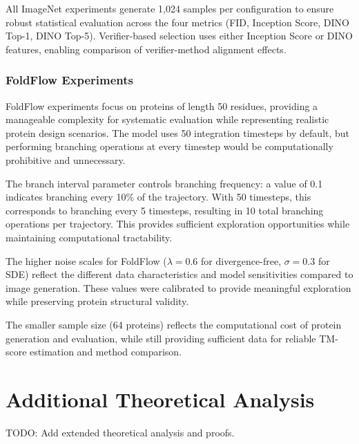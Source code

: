 \documentclass{article}
\begin{document}
All ImageNet experiments generate 1,024 samples per configuration to ensure robust statistical evaluation across the four metrics (FID, Inception Score, DINO Top-1, DINO Top-5). Verifier-based selection uses either Inception Score or DINO features, enabling comparison of verifier-method alignment effects.

\subsubsection{FoldFlow Experiments}

FoldFlow experiments focus on proteins of length 50 residues, providing a manageable complexity for systematic evaluation while representing realistic protein design scenarios. The model uses 50 integration timesteps by default, but performing branching operations at every timestep would be computationally prohibitive and unnecessary.

The branch interval parameter controls branching frequency: a value of 0.1 indicates branching every 10\% of the trajectory. With 50 timesteps, this corresponds to branching every 5 timesteps, resulting in 10 total branching operations per trajectory. This provides sufficient exploration opportunities while maintaining computational tractability.

The higher noise scales for FoldFlow ($\lambda = 0.6$ for divergence-free, $\sigma = 0.3$ for SDE) reflect the different data characteristics and model sensitivities compared to image generation. These values were calibrated to provide meaningful exploration while preserving protein structural validity.

The smaller sample size (64 proteins) reflects the computational cost of protein generation and evaluation, while still providing sufficient data for reliable TM-score estimation and method comparison.

\section{Additional Theoretical Analysis}

TODO: Add extended theoretical analysis and proofs.

\end{document}
